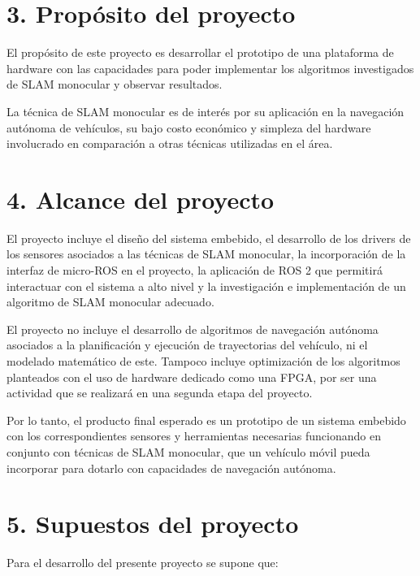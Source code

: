 \documentclass[
11pt, %
codirector, %
]{charter}
\begin{document}
\section{3. Propósito del proyecto}
\label{sec:proposito}

El propósito de este proyecto es desarrollar el prototipo de una plataforma de hardware con las capacidades para poder implementar los algoritmos investigados de SLAM monocular y observar resultados.

La técnica de SLAM monocular es de interés por su aplicación en la navegación autónoma de vehículos, su bajo costo económico y simpleza del hardware involucrado en comparación a otras técnicas utilizadas en el área.

\section{4. Alcance del proyecto}
\label{sec:alcance}

El proyecto incluye el diseño del sistema embebido, el desarrollo de los drivers de los sensores asociados a las técnicas de SLAM monocular, la incorporación de la interfaz de micro-ROS en el proyecto, la aplicación de ROS 2 que permitirá interactuar con el sistema a alto nivel y la investigación e implementación de un algoritmo de SLAM monocular adecuado.

El proyecto no incluye el desarrollo de algoritmos de navegación autónoma asociados a la planificación y ejecución de trayectorias del vehículo, ni el modelado matemático de este. Tampoco incluye optimización de los algoritmos planteados con el uso de hardware dedicado como una FPGA, por ser una actividad que se realizará en una segunda etapa del proyecto.

Por lo tanto, el producto final esperado es un prototipo de un sistema embebido con los correspondientes sensores y herramientas necesarias funcionando en conjunto con técnicas de SLAM monocular, que un vehículo móvil pueda incorporar para dotarlo con capacidades de navegación autónoma.

\section{5. Supuestos del proyecto}
\label{sec:supuestos}

Para el desarrollo del presente proyecto se supone que:
\end{document}
